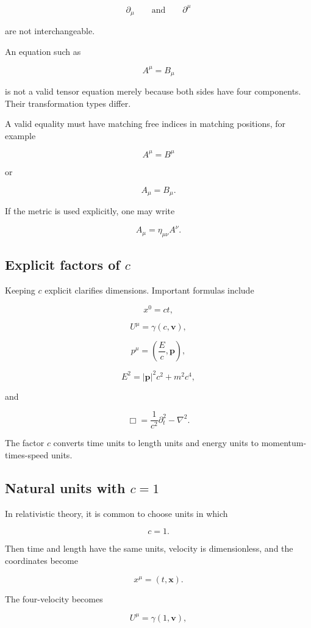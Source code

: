 \[
\partial_{\mu}
\qquad\text{and}\qquad
\partial^{\mu}
\]

are not interchangeable.

An equation such as

\[
A^{\mu}=B_{\mu}
\]

is not a valid tensor equation merely because both sides have four components. Their transformation types differ.

A valid equality must have matching free indices in matching positions, for example

\[
A^{\mu}=B^{\mu}
\]

or

\[
A_{\mu}=B_{\mu}.
\]

If the metric is used explicitly, one may write

\[
A_{\mu}=\eta_{\mu\nu}A^{\nu}.
\]

\subsection{Explicit factors of \(c\)}

Keeping \(c\) explicit clarifies dimensions. Important formulas include

\[
x^{0}=ct,
\]

\[
U^{\mu}=\gamma(c,\mathbf{v}),
\]

\[
p^{\mu}
=
\left(
\frac{E}{c},
\mathbf{p}
\right),
\]

\[
E^{2}
=
|\mathbf{p}|^{2}c^{2}
+
m^{2}c^{4},
\]

and

\[
\Box
=
\frac{1}{c^{2}}\partial_{t}^{2}
-
\nabla^{2}.
\]

The factor \(c\) converts time units to length units and energy units to momentum-times-speed units.

\subsection{Natural units with \(c=1\)}

In relativistic theory, it is common to choose units in which

\[
\boxed{c=1}.
\]

Then time and length have the same units, velocity is dimensionless, and the coordinates become

\[
x^{\mu}=(t,\mathbf{x}).
\]

The four-velocity becomes

\[
U^{\mu}=\gamma(1,\mathbf{v}),
\]

